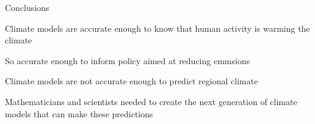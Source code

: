 \begin{slide}{Conclusions}

\begin{list0}

\item Climate models are accurate enough to know that human activity is warming the climate

\item So accurate enough to inform policy aimed at reducing emmsions

\item Climate models are not accurate enough to predict regional climate

\item Mathematicians and scientists needed to create the next generation of climate models that can make these predictions
\end{list0}

\end{slide}
